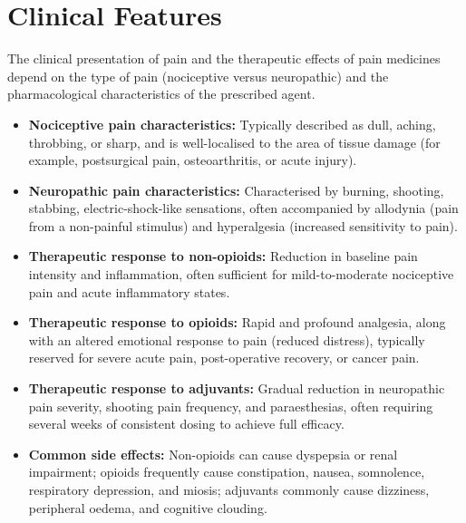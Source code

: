 \section*{Clinical Features}
The clinical presentation of pain and the therapeutic effects of pain medicines depend on the type of pain (nociceptive versus neuropathic) and the pharmacological characteristics of the prescribed agent.
\begin{itemize}
    \item \textbf{Nociceptive pain characteristics:} Typically described as dull, aching, throbbing, or sharp, and is well-localised to the area of tissue damage (for example, postsurgical pain, osteoarthritis, or acute injury).
    \item \textbf{Neuropathic pain characteristics:} Characterised by burning, shooting, stabbing, electric-shock-like sensations, often accompanied by allodynia (pain from a non-painful stimulus) and hyperalgesia (increased sensitivity to pain).
    \item \textbf{Therapeutic response to non-opioids:} Reduction in baseline pain intensity and inflammation, often sufficient for mild-to-moderate nociceptive pain and acute inflammatory states.
    \item \textbf{Therapeutic response to opioids:} Rapid and profound analgesia, along with an altered emotional response to pain (reduced distress), typically reserved for severe acute pain, post-operative recovery, or cancer pain.
    \item \textbf{Therapeutic response to adjuvants:} Gradual reduction in neuropathic pain severity, shooting pain frequency, and paraesthesias, often requiring several weeks of consistent dosing to achieve full efficacy.
    \item \textbf{Common side effects:} Non-opioids can cause dyspepsia or renal impairment; opioids frequently cause constipation, nausea, somnolence, respiratory depression, and miosis; adjuvants commonly cause dizziness, peripheral oedema, and cognitive clouding.
\end{itemize}

